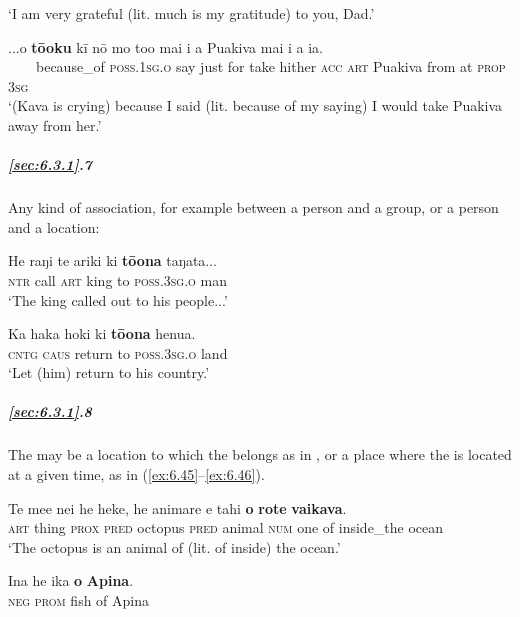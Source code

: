 \glt 
‘I am very grateful (lit. much is my gratitude) to you, Dad.’ \textstyleExampleref{[R363.112]} 
\z

\ea\label{ex:6.41}
\gll ...{\ꞌ}o \textbf{tō{\ꞌ}oku} kī nō mo to{\ꞌ}o mai i a Puakiva mai i a ia. \\
~~~~because\_of \textsc{poss.1sg.o} say just for take hither \textsc{acc} \textsc{art} Puakiva from at \textsc{prop} \textsc{3sg} \\

\glt 
‘(Kava is crying) because I said (lit. because of my saying) I would take Puakiva away from her.’ \textstyleExampleref{[R229.017]} 
\z

\subparagraph{\ref{sec:6.3.1}.7} Any kind of association, for example between a person and a group, or a person and a location:

\ea\label{ex:6.42}
\gll He raŋi te {\ꞌ}ariki ki \textbf{tō{\ꞌ}ona} taŋata... \\
\textsc{ntr} call \textsc{art} king to \textsc{poss.3sg.o} man \\

\glt 
‘The king called out to his people...’ \textstyleExampleref{[MsE-055.005]}
\z

\ea\label{ex:6.43}
\gll Ka haka hoki ki \textbf{tō{\ꞌ}ona} henua.\\
\textsc{cntg} \textsc{caus} return to \textsc{poss.3sg.o} land\\

\glt 
‘Let (him) return to his country.’ \textstyleExampleref{[Ley-9-63.065]}
\z

\subparagraph{\ref{sec:6.3.1}.8} The  may be a location to which the  belongs as in , or a place where the  is located at a given time, as in (\ref{ex:6.45}–\ref{ex:6.46}).

\ea\label{ex:6.44}
\gll Te me{\ꞌ}e nei he heke, he {\ꞌ}animare e tahi \textbf{o} \textbf{rote} \textbf{vaikava}. \\
\textsc{art} thing \textsc{prox} \textsc{pred} octopus \textsc{pred} animal \textsc{num} one of inside\_the ocean \\

\glt 
‘The octopus is an animal of (lit. of inside) the ocean.’ \textstyleExampleref{[R356.029]} 
\z

\ea\label{ex:6.45}
\gll {\ꞌ}Ina he ika \textbf{o} \textbf{{\ꞌ}Apina}. \\
\textsc{neg} \textsc{prom} fish of Apina \\

